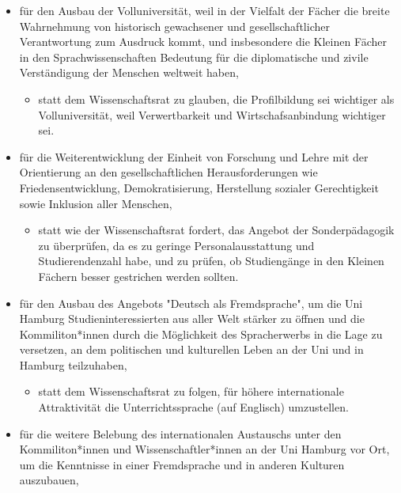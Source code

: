\documentclass[ngerman,headheight=70pt]{scrartcl}
\newenvironment{myitemize}{\begin{itemize}\itemsep -2pt}{\end{itemize}}
\begin{document}
    \begin{myitemize}
        \item für den Ausbau der Volluniversität, weil in der Vielfalt der Fächer
        die breite Wahrnehmung von historisch gewachsener und gesellschaftlicher
        Verantwortung zum Ausdruck kommt, und insbesondere die Kleinen Fächer in
        den Sprachwissenschaften Bedeutung für die diplomatische und zivile
        Verständigung der Menschen weltweit haben,
        \begin{myitemize}
            \item statt dem Wissenschaftsrat zu glauben, die Profilbildung sei
            wichtiger als Volluniversität, weil Verwertbarkeit und
            Wirtschafsanbindung wichtiger sei.
        \end{myitemize}
        \item für die Weiterentwicklung der Einheit von Forschung und Lehre mit
        der Orientierung an den gesellschaftlichen Herausforderungen wie
        Friedensentwicklung, Demokratisierung, Herstellung sozialer Gerechtigkeit
        sowie Inklusion aller Menschen,
        \begin{myitemize}
            \item statt wie der Wissenschaftsrat fordert, das Angebot der
            Sonderpädagogik zu überprüfen, da es zu geringe Personalausstattung
            und Studierendenzahl habe, und zu prüfen, ob Studiengänge in den
            Kleinen Fächern besser gestrichen werden sollten.
        \end{myitemize}
        \item für den Ausbau des Angebots "Deutsch als Fremdsprache", um die Uni
        Hamburg Studieninteressierten aus aller Welt stärker zu öffnen und die
        Kommiliton*innen durch die Möglichkeit des Spracherwerbs in die Lage zu
        versetzen, an dem politischen und kulturellen Leben an der Uni und in
        Hamburg teilzuhaben,
        \begin{myitemize}
            \item statt dem Wissenschaftsrat zu folgen, für höhere internationale
            Attraktivität die Unterrichtssprache (auf Englisch) umzustellen.
        \end{myitemize}
        \item für die weitere Belebung des internationalen Austauschs unter den
        Kommiliton*innen und Wissenschaftler*innen an der Uni Hamburg vor Ort,
        um die Kenntnisse in einer Fremdsprache und in anderen Kulturen auszubauen,

\end{myitemize}
\end{document}
